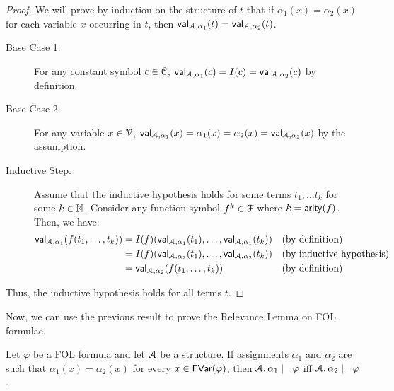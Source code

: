 \documentclass[11pt,usenames, dvipsnames]{article}
\begin{document}
\begin{proof}[Proof]
  We will prove by induction on the structure of $t$ that if $\alpha_1(x) = \alpha_2(x)$ for each variable $x$ occurring in $t$, then $\val{\struct, \alpha_1}{t} = \val{\struct, \alpha_2}{t}$.

  \begin{description}
    \item[Base Case 1.] For any constant symbol $c \in \conn$, $\val{\struct, \alpha_1}{c} = I(c) = \val{\struct, \alpha_2}{c}$ by definition.

    \item[Base Case 2.] For any variable $x \in \vars$, $\val{\struct, \alpha_1}{x} = \alpha_1(x) = \alpha_2(x) = \val{\struct, \alpha_2}{x}$ by the assumption. 

    \item[Inductive Step.] Assume that the inductive hypothesis holds for some terms $t_1, \ldots t_k$ for some $k \in \mathbb{N}$. Consider any function symbol $f^k \in \func$ where $k = \mathsf{arity}(f)$. Then, we have:
    \begin{align*}
    \val{\struct, \alpha_1}{f(t_1, \ldots, t_k)} &= I(f)(\val{\struct, \alpha_1}{t_1}, \ldots, \val{\struct, \alpha_1}{t_k}) &&\text{(by definition)}
    \\
    &= I(f)(\val{\struct, \alpha_2}{t_1}, \ldots, \val{\struct, \alpha_2}{t_k}) &&\text{(by inductive hypothesis)}
    \\
    &= \val{\struct, \alpha_2}{f(t_1, \ldots, t_k)} &&\text{(by definition)}
    \end{align*}
  \end{description}
  Thus, the inductive hypothesis holds for all terms $t$.
\end{proof}

Now, we can use the previous result to prove the Relevance Lemma on FOL formulae.

\begin{lemma}
  Let $\varphi$ be a FOL formula and let $\struct$ be a structure. If assignments $\alpha_1$ and $\alpha_2$ are such that $\alpha_1(x) = \alpha_2(x)$ for every $x \in \mathsf{FVar}(\varphi)$, then $\struct, \alpha_1 \models \varphi$ iff $\struct, \alpha_2 \models \varphi$.
\end{lemma}
\end{document}
